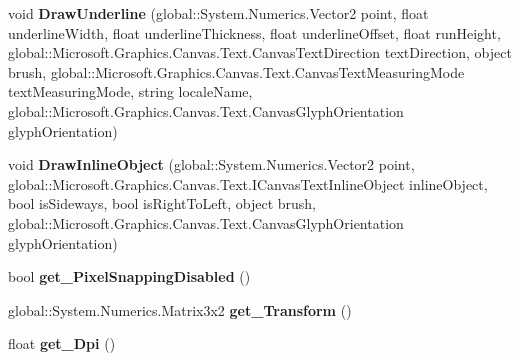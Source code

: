 \begin{DoxyCompactItemize}
\mbox{\label{interface_microsoft_1_1_graphics_1_1_canvas_1_1_text_1_1_i_canvas_text_renderer_a2e1cdd345444973833ad4a9f67ce1601}} 
void {\bfseries Draw\+Underline} (global\+::\+System.\+Numerics.\+Vector2 point, float underline\+Width, float underline\+Thickness, float underline\+Offset, float run\+Height, global\+::\+Microsoft.\+Graphics.\+Canvas.\+Text.\+Canvas\+Text\+Direction text\+Direction, object brush, global\+::\+Microsoft.\+Graphics.\+Canvas.\+Text.\+Canvas\+Text\+Measuring\+Mode text\+Measuring\+Mode, string locale\+Name, global\+::\+Microsoft.\+Graphics.\+Canvas.\+Text.\+Canvas\+Glyph\+Orientation glyph\+Orientation)
\item 
\mbox{\label{interface_microsoft_1_1_graphics_1_1_canvas_1_1_text_1_1_i_canvas_text_renderer_a4ee8342ead2546751b855325b3e50a38}} 
void {\bfseries Draw\+Inline\+Object} (global\+::\+System.\+Numerics.\+Vector2 point, global\+::\+Microsoft.\+Graphics.\+Canvas.\+Text.\+I\+Canvas\+Text\+Inline\+Object inline\+Object, bool is\+Sideways, bool is\+Right\+To\+Left, object brush, global\+::\+Microsoft.\+Graphics.\+Canvas.\+Text.\+Canvas\+Glyph\+Orientation glyph\+Orientation)
\item 
\mbox{\label{interface_microsoft_1_1_graphics_1_1_canvas_1_1_text_1_1_i_canvas_text_renderer_a47f1c1f5b81a4b3e71ddf01f64d0e1e9}} 
bool {\bfseries get\+\_\+\+Pixel\+Snapping\+Disabled} ()
\item 
\mbox{\label{interface_microsoft_1_1_graphics_1_1_canvas_1_1_text_1_1_i_canvas_text_renderer_a7a6a6deb82895cb39ac5fd578ed86cfd}} 
global\+::\+System.\+Numerics.\+Matrix3x2 {\bfseries get\+\_\+\+Transform} ()
\item 
\mbox{\label{interface_microsoft_1_1_graphics_1_1_canvas_1_1_text_1_1_i_canvas_text_renderer_a6dde43e44cf9d35e89b72e336e4aa41c}} 
float {\bfseries get\+\_\+\+Dpi} ()
\item 
\mbox{\label{interface_microsoft_1_1_graphics_1_1_canvas_1_1_text_1_1_i_canvas_text_renderer_a251cf38ca7077b36bbfacf617f946c68}} 

\end{DoxyCompactItemize}
